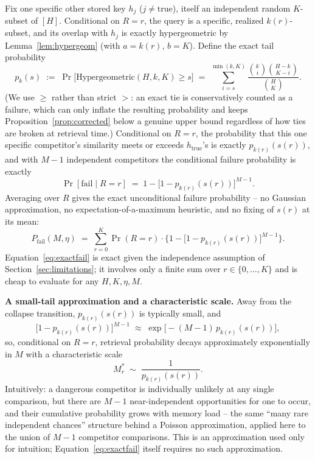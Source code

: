 \documentclass[11pt]{article}
\begin{document}
Fix one specific other stored key $h_j$ ($j \ne \text{true}$), itself an independent random
$K$-subset of $[H]$. Conditional on $R=r$, the query is a specific, realized $k(r)$-subset, and
its overlap with $h_j$ is exactly hypergeometric by Lemma~\ref{lem:hypergeom} (with $a=k(r)$,
$b=K$). Define the exact tail probability
\[
p_k(s) \;:=\; \Pr\big[\mathrm{Hypergeometric}(H,k,K) \ge s\big]
\;=\; \sum_{i=s}^{\min(k,K)} \frac{\binom{k}{i}\binom{H-k}{K-i}}{\binom{H}{K}}.
\]
(We use $\ge$ rather than strict $>$: an exact tie is conservatively counted as a failure, which
can only inflate the resulting probability and keeps Proposition~\ref{prop:corrected} below a
genuine upper bound regardless of how ties are broken at retrieval time.) Conditional on $R=r$,
the probability that this one specific competitor's similarity meets or exceeds
$h_{\text{true}}$'s is exactly $p_{k(r)}(s(r))$, and with $M-1$ independent competitors the
conditional failure probability is exactly
\[
\Pr[\text{fail} \mid R=r] \;=\; 1 - \big[1-p_{k(r)}(s(r))\big]^{M-1}.
\]
Averaging over $R$ gives the exact unconditional failure probability -- no Gaussian
approximation, no expectation-of-a-maximum heuristic, and no fixing of $s(r)$ at its mean:
\begin{equation}
P_{\text{fail}}(M,\eta) \;=\; \sum_{r=0}^{K} \Pr(R=r) \cdot
\Big\{ 1 - \big[1-p_{k(r)}(s(r))\big]^{M-1} \Big\}.
\label{eq:exactfail}
\end{equation}
Equation~\ref{eq:exactfail} is exact given the independence assumption of
Section~\ref{sec:limitations}; it involves only a finite sum over $r \in \{0,\dots,K\}$ and is
cheap to evaluate for any $H,K,\eta,M$.

\noindent\textbf{A small-tail approximation and a characteristic scale.} Away from the collapse
transition, $p_{k(r)}(s(r))$ is typically small, and
\[
\big[1-p_{k(r)}(s(r))\big]^{M-1} \;\approx\; \exp\big[-(M-1)\,p_{k(r)}(s(r))\big],
\]
so, conditional on $R=r$, retrieval probability decays approximately exponentially in $M$ with a
characteristic scale
\[
M^*_r \;\sim\; \frac{1}{p_{k(r)}(s(r))}.
\]
Intuitively: a dangerous competitor is individually unlikely at any single comparison, but there
are $M-1$ near-independent opportunities for one to occur, and their cumulative probability grows
with memory load -- the same ``many rare independent chances'' structure behind a Poisson
approximation, applied here to the union of $M-1$ competitor comparisons. This is an approximation
used only for intuition; Equation~\ref{eq:exactfail} itself requires no such approximation.
\end{document}
